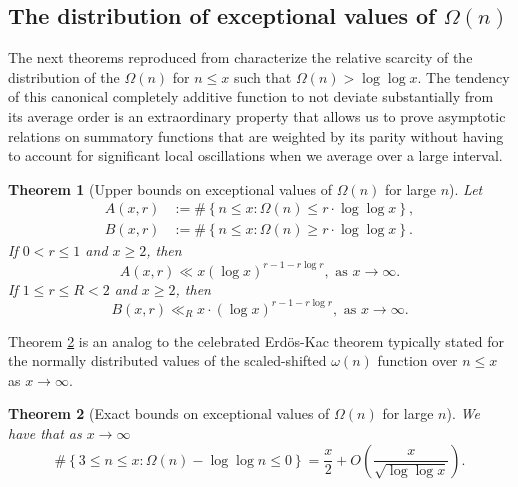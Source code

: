 \documentclass[11pt,reqno,a4letter]{article}
\numberwithin{figure}{section}
\numberwithin{table}{section}
\theoremstyle{plain}
\newtheorem{theorem}{Theorem}
\numberwithin{theorem}{section}
\theoremstyle{definition}
\begin{document}
\subsection{The distribution of exceptional values of $\Omega(n)$} 

The next theorems reproduced from \cite[\S 7.4]{MV} characterize the relative 
scarcity of the distribution of the $\Omega(n)$ for $n \leq x$ such that 
$\Omega(n) > \log\log x$. The tendency of this canonical completely additive 
function to not deviate substantially from its average order is an extraordinary 
property that allows us to prove asymptotic relations on summatory functions that 
are weighted by its parity without having to account for significant local 
oscillations when we average over a large interval. 

\begin{theorem}[Upper bounds on exceptional values of $\Omega(n)$ for large $n$] 
\label{theorem_MV_Thm7.20-init_stmt} 
Let 
\begin{align*} 
A(x, r) & := \#\left\{n \leq x: \Omega(n) \leq r \cdot \log\log x\right\}, \\ 
B(x, r) & := \#\left\{n \leq x: \Omega(n) \geq r \cdot \log\log x\right\}. 
\end{align*} 
If $0 < r \leq 1$ and $x \geq 2$, then 
\[
A(x, r) \ll x (\log x)^{r-1 - r\log r}, \text{ \ as\ } x \rightarrow \infty. 
\]
If $1 \leq r \leq R < 2$ and $x \geq 2$, then 
\[
B(x, r) \ll_R x \cdot (\log x)^{r-1-r \log r}, \text{ \ as\ } x \rightarrow \infty. 
\]
\end{theorem} 

Theorem \ref{theorem_MV_Thm7.21-init_stmt} is an analog to the 
celebrated Erd\"os-Kac theorem typically stated for the 
normally distributed values of the scaled-shifted $\omega(n)$ function over $n \leq x$ as 
$x \rightarrow \infty$. 

\begin{theorem}[Exact bounds on exceptional values of $\Omega(n)$ for large $n$] 
\label{theorem_MV_Thm7.21-init_stmt} 
We have that as $x \rightarrow \infty$ 
\[
\#\left\{3 \leq n \leq x: \Omega(n) - \log\log n \leq 0\right\} = 
     \frac{x}{2} + O\left(\frac{x}{\sqrt{\log\log x}}\right). 
\]
\end{theorem} 
\end{document}
